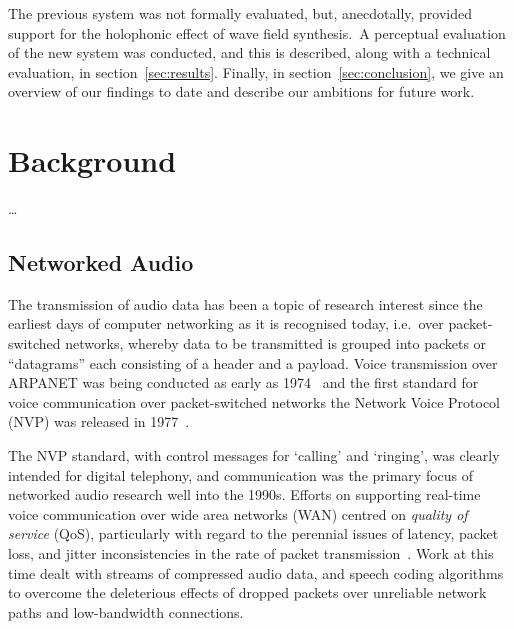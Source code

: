 \documentclass[utf8]{FrontiersinHarvard}
\newcommand{\secref}[1]{section~\ref{#1}}
\begin{document}
    The previous system was not formally evaluated, but, anecdotally, provided
    support for the holophonic effect of wave field synthesis.\
    A perceptual evaluation of the new system was conducted, and this is
    described, along with a technical evaluation, in \secref{sec:results}.
    Finally, in \secref{sec:conclusion}, we give an overview of our findings to
    date and describe our ambitions for future work.

    \section{Background}\label{sec:background}

    \dots

    \subsection{Networked Audio}\label{subsec:networked-audio}

    The transmission of audio data has been a topic of research interest since the
    earliest days of computer networking as it is recognised today, i.e.\ over
    packet-switched networks, whereby data to be transmitted is grouped into
    packets \textemdash{} or ``datagrams'' \textemdash{} each consisting of a header
    and a payload.
    Voice transmission over ARPANET was being conducted as early as
    1974~\citep{schulzrinne_voice_1992} and the first standard for voice
    communication over packet-switched networks \textemdash{} the Network Voice
    Protocol (NVP) \textemdash{} was released in
    1977~\citep{cohen_specifications_1977}.

    The NVP standard, with control messages for `calling' and `ringing', was
    clearly intended for digital telephony, and communication was the primary
    focus of networked audio research well into the 1990s.
    Efforts on supporting real-time voice communication over wide area networks
    (WAN) centred on \textit{quality of service} (QoS), particularly with regard
    to the perennial issues of latency, packet loss, and jitter
    \textemdash{} inconsistencies in the rate of packet
    transmission~\citep{hardman_reliable_1995,hardman_successful_1998}.
    Work at this time dealt with streams of compressed audio data, and speech
    coding algorithms to overcome the deleterious effects of dropped packets
    over unreliable network paths and low-bandwidth connections.
\end{document}
